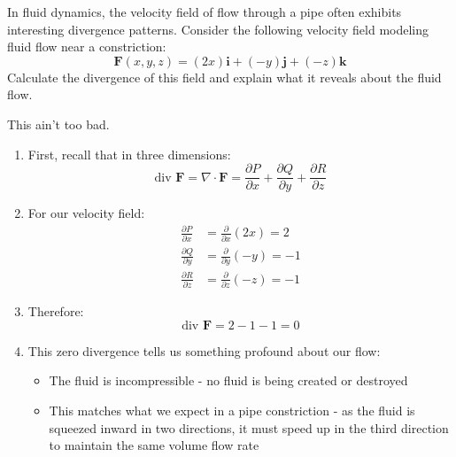 \exampleline
\begin{example}
In fluid dynamics, the velocity field of flow through a pipe often exhibits interesting divergence patterns. Consider the following velocity field modeling fluid flow near a constriction:
\[
\mathbf{F}(x,y,z) = (2x)\mathbf{i} + (-y)\mathbf{j} + (-z)\mathbf{k}
\]
Calculate the divergence of this field and explain what it reveals about the fluid flow.

\begin{solution}
This ain't too bad.
\begin{enumerate}
\item First, recall that in three dimensions:
\[
\text{div }\mathbf{F} = \nabla \cdot \mathbf{F} = \frac{\partial P}{\partial x} + \frac{\partial Q}{\partial y} + \frac{\partial R}{\partial z}
\]

\item For our velocity field:
\begin{align*}
\frac{\partial P}{\partial x} &= \frac{\partial}{\partial x}(2x) = 2 \\[0.5em]
\frac{\partial Q}{\partial y} &= \frac{\partial}{\partial y}(-y) = -1 \\[0.5em]
\frac{\partial R}{\partial z} &= \frac{\partial}{\partial z}(-z) = -1
\end{align*}

\item Therefore:
\[
\text{div }\mathbf{F} = 2 - 1 - 1 = 0
\]

\item This zero divergence tells us something profound about our flow:
\begin{itemize}
   \item The fluid is incompressible - no fluid is being created or destroyed
   \item This matches what we expect in a pipe constriction - as the fluid is squeezed inward in two directions, it must speed up in the third direction to maintain the same volume flow rate
\end{itemize}

\end{enumerate}

\begin{figure}[H]
\centering
{}
\end{figure}
\end{solution}
\end{example}
